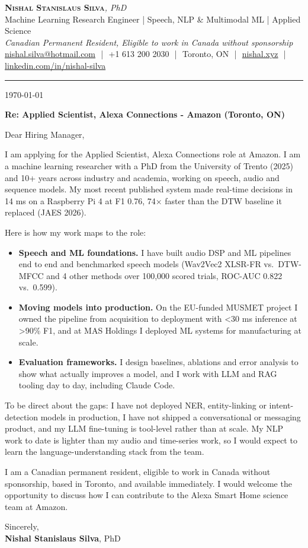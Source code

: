 \documentclass[11pt]{article}
\makeatletter
\newcommand{\clName}{Nishal Stanislaus Silva}
\newcommand{\clEmail}{nishal.silva@hotmail.com}
\newcommand{\clPhone}{+1 613 200 2030}
\newcommand{\clCity}{Toronto, ON}
\newcommand{\clSite}{https://nishal.xyz}
\newcommand{\clLinkedIn}{https://www.linkedin.com/in/nishal-silva}
\newcommand{\clStatus}{Canadian Permanent Resident, Eligible to work in Canada without sponsorship}
\newcommand{\clTagline}{Machine Learning Research Engineer | Speech, NLP \& Multimodal ML | Applied Science}
\newcommand{\clRole}{Applied Scientist, Alexa Connections}
\newcommand{\clCompany}{Amazon}
\newcommand{\clTeam}{the Alexa Smart Home science team}
\newcommand{\clAddressee}{Dear Hiring Manager,}
\makeatother
\begin{document}
\pagestyle{empty}

\begin{center}
    {\LARGE \scshape \textbf{\clName}}{\large \textit{, PhD}}
    \\[1pt]
    {\small \clTagline}
    \\[1pt]
    {\footnotesize\textit{\clStatus}}
    \\[1pt]
    {\small
    \href{mailto:\clEmail}{\clEmail}
    \,\,|\,\, \clPhone
    \,\,|\,\, \clCity
    \,\,|\,\, \href{\clSite}{nishal.xyz}
    \,\,|\,\, \href{\clLinkedIn}{linkedin.com/in/nishal-silva}}
\end{center}

\rule{\linewidth}{0.4pt}\vspace{0.6em}

\today

\textbf{Re: \clRole{} - \clCompany{} (Toronto, ON)}

\clAddressee

I am applying for the \clRole{} role at \clCompany{}. I am a machine learning researcher with a PhD from the University of Trento (2025) and 10+ years across industry and academia, working on speech, audio and sequence models. My most recent published system made real-time decisions in 14 ms on a Raspberry Pi 4 at F1 0.76, 74$\times$ faster than the DTW baseline it replaced (JAES 2026).

Here is how my work maps to the role:
\begin{itemize}[leftmargin=1.4em, itemsep=0.1em, topsep=0.2em]
    \item \textbf{Speech and ML foundations.} I have built audio DSP and ML pipelines end to end and benchmarked speech models (Wav2Vec2 XLSR-FR vs.\ DTW-MFCC and 4 other methods over 100,000 scored trials, ROC-AUC 0.822 vs.\ 0.599).
    \item \textbf{Moving models into production.} On the EU-funded MUSMET project I owned the pipeline from acquisition to deployment with <30 ms inference at >90\% F1, and at MAS Holdings I deployed ML systems for manufacturing at scale.
    \item \textbf{Evaluation frameworks.} I design baselines, ablations and error analysis to show what actually improves a model, and I work with LLM and RAG tooling day to day, including Claude Code.
\end{itemize}
To be direct about the gaps: I have not deployed NER, entity-linking or intent-detection models in production, I have not shipped a conversational or messaging product, and my LLM fine-tuning is tool-level rather than at scale. My NLP work to date is lighter than my audio and time-series work, so I would expect to learn the language-understanding stack from the team.

I am a Canadian permanent resident, eligible to work in Canada without sponsorship, based in Toronto, and available immediately. I would welcome the opportunity to discuss how I can contribute to \clTeam{} at \clCompany{}.

\vspace{8pt}
Sincerely,\\[2pt]
\textbf{\clName}, PhD
\end{document}
